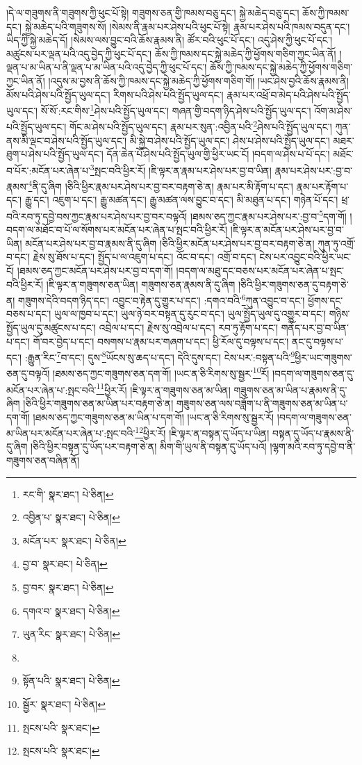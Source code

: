 །དེ་ལ་གཟུགས་ནི་གཟུགས་ཀྱི་ཕུང་པོ་སྟེ། གཟུགས་ཅན་གྱི་ཁམས་བཅུ་དང་། སྐྱེ་མཆེད་བཅུ་དང་། ཆོས་ཀྱི་ཁམས་དང་། སྐྱེ་མཆེད་པའི་གཟུགས་སོ། །སེམས་ནི་རྣམ་པར་ཤེས་པའི་ཕུང་པོ་སྟེ། རྣམ་པར་ཤེས་པའི་ཁམས་བདུན་དང་། ཡིད་ཀྱི་སྐྱེ་མཆེད་དོ། །སེམས་ལས་བྱུང་བའི་ཆོས་རྣམས་ནི། ཚོར་བའི་ཕུང་པོ་དང་། འདུ་ཤེས་ཀྱི་ཕུང་པོ་དང་། མཚུངས་པར་ལྡན་པའི་འདུ་བྱེད་ཀྱི་ཕུང་པོ་དང་། ཆོས་ཀྱི་ཁམས་དང་སྐྱེ་མཆེད་ཀྱི་ཕྱོགས་གཅིག་ཀྱང་ཡིན་ནོ། །ལྡན་པ་མ་ཡིན་པ་ནི་ལྡན་པ་མ་ཡིན་པའི་འདུ་བྱེད་ཀྱི་ཕུང་པོ་དང་། ཆོས་ཀྱི་ཁམས་དང་སྐྱེ་མཆེད་ཀྱི་ཕྱོགས་གཅིག་ཀྱང་ཡིན་ནོ། །འདུས་མ་བྱས་ནི་ཆོས་ཀྱི་ཁམས་དང་སྐྱེ་མཆེད་ཀྱི་ཕྱོགས་གཅིག་གོ། །ཡང་ཤེས་བྱའི་ཆོས་རྣམས་ནི། མོས་པའི་ཤེས་པའི་སྤྱོད་ཡུལ་དང་། རིགས་པའི་ཤེས་པའི་སྤྱོད་ཡུལ་དང་། རྣམ་པར་འཕྲོ་བ་མེད་པའི་ཤེས་པའི་སྤྱོད་ཡུལ་དང་། སོ་སོ་:རང་གིས་\footnote{རང་གི་  སྣར་ཐང་།  པེ་ཅིན། }ཤེས་པའི་སྤྱོད་ཡུལ་དང་། གཞན་གྱི་བདག་ཉིད་ཤེས་པའི་སྤྱོད་ཡུལ་དང་། འོག་མ་ཤེས་པའི་སྤྱོད་ཡུལ་དང་། གོང་མ་ཤེས་པའི་སྤྱོད་ཡུལ་དང་། རྣམ་པར་སུན་:འབྱིན་པའི་\footnote{འབྱིན་པ་  སྣར་ཐང་།  པེ་ཅིན། }ཤེས་པའི་སྤྱོད་ཡུལ་དང་། ཀུན་ནས་མི་ལྡང་བ་ཤེས་པའི་སྤྱོད་ཡུལ་དང་། མི་སྐྱེ་བ་ཤེས་པའི་སྤྱོད་ཡུལ་དང་། ཤེས་པ་ཤེས་པའི་སྤྱོད་ཡུལ་དང་། མཐར་ཐུག་པ་ཤེས་པའི་སྤྱོད་ཡུལ་དང་། དོན་ཆེན་པོ་ཤེས་པའི་སྤྱོད་ཡུལ་གྱི་ཕྱིར་ཡང་ངོ། །བདག་ལ་ཤེས་པ་པོ་དང་། མཐོང་བ་པོར་:མངོན་པར་ཞེན་པ་\footnote{མངོན་པར་  སྣར་ཐང་།  པེ་ཅིན། }སྤང་བའི་ཕྱིར་རོ། །ཇི་ལྟར་ན་རྣམ་པར་ཤེས་པར་བྱ་བ་ཡིན། རྣམ་པར་ཤེས་པར་:བྱ་བ་རྣམས་\footnote{བྱ་བ་  སྣར་ཐང་།  པེ་ཅིན། }ནི་དུ་ཞིག །ཅིའི་ཕྱིར་རྣམ་པར་ཤེས་པར་བྱ་བར་བརྟག་ཅེ་ན། རྣམ་པར་མི་རྟོག་པ་དང་། རྣམ་པར་རྟོག་པ་དང་། རྒྱུ་དང་། འཇུག་པ་དང་། རྒྱུ་མཚན་དང་། རྒྱུ་མཚན་ལས་བྱུང་བ་དང་། མི་མཐུན་པ་དང་། གཉེན་པོ་དང་། ཕྲ་བའི་རབ་ཏུ་དབྱེ་བས་ཀྱང་རྣམ་པར་ཤེས་པར་བྱ་བར་བལྟའོ། །ཐམས་ཅད་ཀྱང་རྣམ་པར་ཤེས་པར་:བྱ་བ་\footnote{བྱ་བར་  སྣར་ཐང་།  པེ་ཅིན། }དག་གོ། །བདག་ལ་མཐོང་བ་པོ་ལ་སོགས་པར་མངོན་པར་ཞེན་པ་སྤང་བའི་ཕྱིར་རོ། །ཇི་ལྟར་ན་མངོན་པར་ཤེས་པར་བྱ་བ་ཡིན། མངོན་པར་ཤེས་པར་བྱ་བ་རྣམས་ནི་དུ་ཞིག །ཅིའི་ཕྱིར་མངོན་པར་ཤེས་པར་བྱ་བར་བརྟག་ཅེ་ན། ཀུན་ཏུ་འགྲོ་བ་དང་། རྗེས་སུ་ཐོས་པ་དང་། སྤྱོད་པ་ལ་འཇུག་པ་དང་། འོང་བ་དང་། འགྲོ་བ་དང་། ངེས་པར་འབྱུང་བའི་ཕྱིར་ཡང་ངོ། །ཐམས་ཅད་ཀྱང་མངོན་པར་ཤེས་པར་བྱ་བ་དག་གོ། །བདག་ལ་མཐུ་དང་བཅས་པར་མངོན་པར་ཞེན་པ་སྤང་བའི་ཕྱིར་རོ། །ཇི་ལྟར་ན་གཟུགས་ཅན་ཡིན། གཟུགས་ཅན་རྣམས་ནི་དུ་ཞིག །ཅིའི་ཕྱིར་གཟུགས་ཅན་དུ་བརྟག་ཅེ་ན། གཟུགས་དེའི་བདག་ཉིད་དང་། འབྱུང་བ་རྟེན་དུ་གྱུར་པ་དང་། :དགའ་བའི་\footnote{དགའ་བ་  སྣར་ཐང་།  པེ་ཅིན། }ཀུན་འབྱུང་བ་དང་། ཕྱོགས་དང་བཅས་པ་དང་། ཡུལ་ལ་ཁྱབ་པ་དང་། ཡུལ་ཉེ་བར་བསྟན་དུ་རུང་བ་དང་། ཡུལ་སྤྱོད་ཡུལ་དུ་འགྱུར་བ་དང་། གཉིས་སྤྱོད་ཡུལ་དུ་མཚུངས་པ་དང་། འབྲེལ་པ་དང་། རྗེས་སུ་འབྲེལ་པ་དང་། རབ་ཏུ་རྟོག་པ་དང་། གནོད་པར་བྱ་བ་ཡིན་པ་དང་། གོ་བར་བྱེད་པ་དང་། བསགས་པ་རྣམ་པར་གཞག་པ་དང་། ཕྱི་རོལ་དུ་བལྟས་པ་དང་། ནང་དུ་བལྟས་པ་དང་། :རྒྱུན་རིང་\footnote{ཡུན་རིང་  སྣར་ཐང་།  པེ་ཅིན། }བ་དང་། དུས་\footnote{}ཡོངས་སུ་ཆད་པ་དང་། དེའི་དུས་དང་། ངེས་པར་:བསྟན་པའི་\footnote{སྟོན་པའི་  སྣར་ཐང་།  པེ་ཅིན། }ཕྱིར་ཡང་གཟུགས་ཅན་དུ་བལྟའོ། །ཐམས་ཅད་ཀྱང་གཟུགས་ཅན་དག་གོ། །ཡང་ན་ཅི་རིགས་སུ་སྦྱར་\footnote{སྦྱོར་  སྣར་ཐང་།  པེ་ཅིན། }རོ། །བདག་ལ་གཟུགས་ཅན་དུ་མངོན་པར་ཞེན་པ་:སྤང་བའི་\footnote{སྤངས་པའི་  སྣར་ཐང་། }ཕྱིར་རོ། །ཇི་ལྟར་ན་གཟུགས་ཅན་མ་ཡིན། གཟུགས་ཅན་མ་ཡིན་པ་རྣམས་ནི་དུ་ཞིག །ཅིའི་ཕྱིར་གཟུགས་ཅན་མ་ཡིན་པར་བརྟག་ཅེ་ན། གཟུགས་ཅན་ལས་བཟློག་པ་ནི་གཟུགས་ཅན་མ་ཡིན་པ་དག་གོ། །ཐམས་ཅད་ཀྱང་གཟུགས་ཅན་མ་ཡིན་པ་དག་གོ། །ཡང་ན་ཅི་རིགས་སུ་སྦྱར་རོ། །བདག་ལ་གཟུགས་ཅན་མ་ཡིན་པར་མངོན་པར་ཞེན་པ་:སྤང་བའི་\footnote{སྤངས་པའི་  སྣར་ཐང་། }ཕྱིར་རོ། །ཇི་ལྟར་ན་བསྟན་དུ་ཡོད་པ་ཡིན། བསྟན་དུ་ཡོད་པ་རྣམས་ནི་དུ་ཞིག །ཅིའི་ཕྱིར་བསྟན་དུ་ཡོད་པར་བརྟག་ཅེ་ན། མིག་གི་ཡུལ་ནི་བསྟན་དུ་ཡོད་པའོ། །ལྷག་མའི་རབ་ཏུ་དབྱེ་བ་ནི་གཟུགས་ཅན་བཞིན་ནོ། 